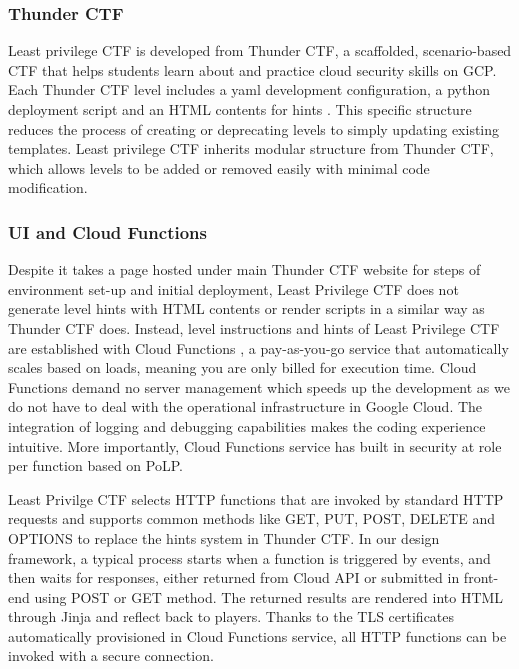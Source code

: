 \documentclass[sigconf]{acmart}
\begin{document}
\subsubsection{Thunder CTF}
Least privilege CTF is developed from Thunder CTF, a scaffolded, scenario-based CTF that helps students learn about and practice cloud security skills on GCP. Each Thunder CTF level includes a yaml development configuration, a python deployment script and an HTML contents for hints \cite{Springer}. This specific structure reduces the process of creating or deprecating levels to simply updating existing templates. Least privilege CTF inherits modular structure from Thunder CTF, which allows levels to be added or removed easily with minimal code modification.

\subsubsection{UI and Cloud Functions}
Despite it takes a page \cite{lst-ctf} hosted under main Thunder CTF website for steps of environment set-up and initial deployment, Least Privilege CTF does not generate level hints with HTML contents or render scripts in a similar way as Thunder CTF does. Instead, level instructions and hints of Least Privilege CTF are established with Cloud Functions \cite{cloudfunc}, a pay-as-you-go service that automatically scales based on loads, meaning you are only billed for execution time. Cloud Functions demand no server management which speeds up the development as we do not have to deal with the operational infrastructure in Google Cloud. The integration of logging and debugging capabilities makes the coding experience intuitive. More importantly, Cloud Functions service has built in security at role per function based on PoLP. 

Least Privilge CTF selects HTTP functions \cite{httpfunc} that are invoked by standard HTTP requests and supports common methods like GET, PUT, POST, DELETE and OPTIONS to replace the hints system in Thunder CTF. In our design framework, a typical process starts when a function is triggered by events, and then waits for responses, either returned from Cloud API or submitted in front-end using POST or GET method. The returned results are rendered into HTML through Jinja and reflect back to players. Thanks to the TLS certificates automatically provisioned in Cloud Functions service,  all HTTP functions can be invoked with a secure connection. 
\end{document}
